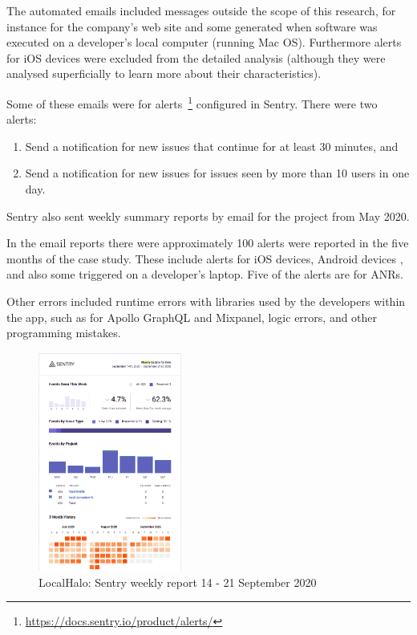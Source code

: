 The automated emails included messages outside the scope of this research, for instance for the company's web site and some generated when software was executed on a developer's local computer (running Mac OS). Furthermore alerts for iOS devices were excluded from the detailed analysis (although they were analysed superficially to learn more about their characteristics). 

Some of these emails were for alerts~\footnote{\url{https://docs.sentry.io/product/alerts/}} configured in Sentry. There were two alerts: 
\begin{enumerate}
    \itemsep0em
    \item Send a notification for new issues that continue for at least 30 minutes, and
    \item Send a notification for new issues for issues seen by more than 10 users in one day.
\end{enumerate}  
Sentry also sent weekly summary reports by email for the project from  May 2020.

In the email reports there were approximately 100 alerts were reported in the five months of the case study. These include alerts for iOS devices, Android devices %
, and also some triggered on a developer's laptop. Five of the alerts are for ANRs. 



Other errors included runtime errors with libraries used by the developers within the app, such as for Apollo GraphQL and Mixpanel, logic errors, and other programming mistakes. 


\begin{figure}
  \begin{center}
    \includegraphics[width=0.42\textwidth]{images/localhalo/sentry-weekly-report-21-Sep-2020.png}
  \end{center}
  \caption{LocalHalo: Sentry weekly report 14 - 21 September 2020}
  \label{fig:localhalo-sentry-weekly-report-21-sep-2020}
\end{figure}

